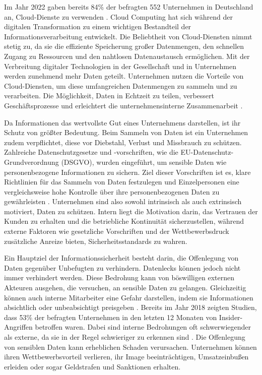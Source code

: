 Im Jahr 2022 gaben bereits 84\% der befragten 552 Unternehmen in Deutschland an, Cloud-Dienste zu verwenden \cite{KPMG.2022}. Cloud Computing hat sich während der digitalen Transformation zu einem wichtigen Bestandteil der Informationsverarbeitung entwickelt. Die Beliebtheit von Cloud-Diensten nimmt stetig zu, da sie die effiziente Speicherung großer Datenmengen, den schnellen Zugang zu Ressourcen und den nahtlosen Datenaustausch ermöglichen. Mit der Verbreitung digitaler Technologien in der Gesellschaft und in Unternehmen werden zunehmend mehr Daten geteilt. Unternehmen nutzen die Vorteile von Cloud-Diensten, um diese umfangreichen Datenmengen zu sammeln und zu verarbeiten. Die Möglichkeit, Daten in Echtzeit zu teilen, verbessert Geschäftsprozesse und erleichtert die unternehmensinterne Zusammenarbeit \cite{Surianarayanan.2023b}. %

Da Informationen das wertvollste Gut eines Unternehmens darstellen, ist ihr Schutz von größter Bedeutung. Beim Sammeln von Daten ist ein Unternehmen zudem verpflichtet, diese vor Diebstahl, Verlust und Missbrauch zu schützen. Zahlreiche Datenschutzgesetze und -vorschriften, wie die EU-Datenschutz-Grundverordnung (DSGVO), wurden eingeführt, um sensible Daten wie personenbezogene Informationen zu sichern. Ziel dieser Vorschriften ist es, klare Richtlinien für das Sammeln von Daten festzulegen und Einzelpersonen eine vergleichsweise hohe Kontrolle über ihre personenbezogenen Daten zu gewährleisten \cite{Kuzina.2023}. %
Unternehmen sind also sowohl intrinsisch als auch extrinsisch motiviert, Daten zu schützen. Intern liegt die Motivation darin, das Vertrauen der Kunden zu erhalten und die betriebliche Kontinuität sicherzustellen, während externe Faktoren wie gesetzliche Vorschriften und der Wettbewerbsdruck zusätzliche Anreize bieten, Sicherheitsstandards zu wahren.

Ein Hauptziel der Informationssicherheit besteht darin, die Offenlegung von Daten gegenüber Unbefugten zu verhindern. Datenlecks können jedoch nicht immer verhindert werden. Diese Bedrohung kann von böswilligen externen Akteuren ausgehen, die versuchen, an sensible Daten zu gelangen. Gleichzeitig können auch interne Mitarbeiter eine Gefahr darstellen, indem sie Informationen absichtlich oder unbeabsichtigt preisgeben  \cite{Alneyadi.2016}. Bereits im Jahr 2018 zeigten Studien, dass 53\% der befragten Unternehmen in den letzten 12 Monaten von Insider-Angriffen betroffen waren. Dabei sind interne Bedrohungen oft schwerwiegender als externe, da sie in der Regel schwieriger zu erkennen sind \cite{CATechnologies.2018}.
Die Offenlegung von sensiblen Daten kann erheblichen Schaden verursachen. Unternehmen können ihren Wettbewerbsvorteil verlieren, ihr Image beeinträchtigen, Umsatzeinbußen erleiden oder sogar Geldstrafen und Sanktionen erhalten.

